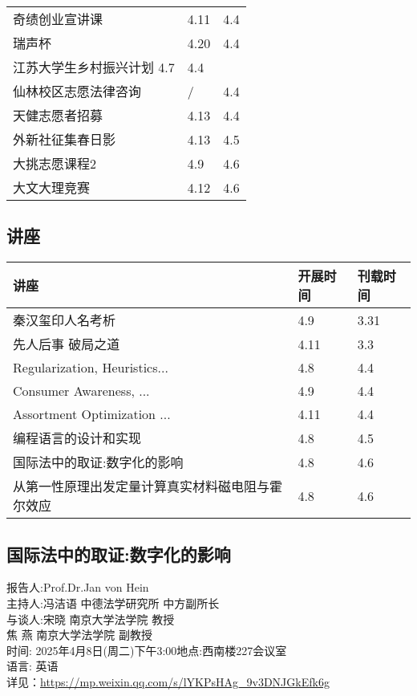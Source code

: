 \documentclass[letterpaper, 12pt]{article}
\begin{document}
\begin{multicols}{2}
{\begin{longtable}{|>{\centering\arraybackslash}m{}|m{}|m{}|}
    奇绩创业宣讲课 & 4.11 & 4.4\\
    瑞声杯 & 4.20 & 4.4\\
    江苏大学生乡村振兴计划 4.7 & 4.4\\
    仙林校区志愿法律咨询 & / & 4.4\\
    天健志愿者招募 & 4.13 & 4.4\\
    外新社征集春日影 & 4.13 & 4.5\\
    大挑志愿课程2 & 4.9 & 4.6\\
    大文大理竞赛 & 4.12 & 4.6\\
    \hline
\end{longtable}
\unskip
\unpenalty
\unpenalty}\unvbox\colbbox
\end{multicols}
\begin{multicols}{2}
\pagebreak

\section{讲座}
\begin{tabular}{|>{\centering\arraybackslash}m{}|m{}|m{}|}
    \hline
    讲座 & 开展时间 & 刊载时间\\
    \hline\hline
    秦汉玺印人名考析 & 4.9 & 3.31\\\hline
    先人后事 破局之道 & 4.11 & 3.3\\\hline
    Regularization, Heuristics... & 4.8 & 4.4\\\hline
    Consumer Awareness, ... & 4.9 & 4.4\\\hline
    Assortment Optimization ... & 4.11 & 4.4\\\hline
    编程语言的设计和实现 & 4.8 & 4.5\\\hline
    国际法中的取证:数字化的影响 & 4.8 & 4.6\\\hline
    从第一性原理出发定量计算真实材料磁电阻与霍尔效应 & 4.8 & 4.6\\\hline
\end{tabular}

\subsection{国际法中的取证:数字化的影响}
报告人:Prof.Dr.Jan von Hein
\\主持人:冯洁语 中德法学研究所 中方副所长
\\与谈人:宋晓 南京大学法学院 教授
\\焦 燕 南京大学法学院 副教授
\\时间: 2025年4月8日(周二)下午3:00地点:西南楼227会议室
\\语言:  英语
\\详见：\url{https://mp.weixin.qq.com/s/lYKPsHAg_9v3DNJGkEfk6g}


\end{multicols}
\end{document}
